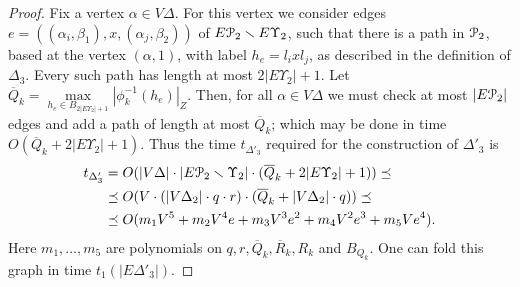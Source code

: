 \documentclass[a4paper,12pt]{article}
\renewcommand{\a}{\alpha }
\renewcommand{\b}{\beta }
\newcommand{\G}{\Gamma }
\newcommand{\D}{\Delta }
\newcommand{\T}{\Theta }
\newcommand{\U}{\Upsilon }
\newcommand{\cP}{{\cal{P}}}
\numberwithin{equation}{section}
\numberwithin{figure}{section}
\begin{document}
\begin{proof}
Fix a vertex $\a \in V\D$. For this vertex we consider edges
$e=((\a_i,\b_1), x,(\a_j,\b_2) )$ of $E\cP_2\smallsetminus E\U_2$,
such that there
is a path in $\cP_2$, based at the  vertex $(\a,1)$, with label
$h_e=l_i x l_j$, as described in the definition of $\D_3$. Every
such path has   length at most  $2 |E \U_2| +1$. Let
$\overline{Q}_k=\max\limits_{h_e \in B_{2|E \U_2|
+1}}|\phi^{-1}_k(h_e)|_Z$.
Then, for all $\a \in V\D$ we must check at most
$|E\cP_2|$ edges and add a path of length at most $\overline{Q}_k$;
 which may be done  in time $O(\overline{Q}_k+2 |E\U_2| +1)$.
Thus the time $t_{\D'_3}$ required for the construction of $\D'_3$
is
\begin{equation}\label{theta'3}
\begin{split}
t_{\D'_3} &= O(|V\D|\cdot |E\cP_2\smallsetminus \U_2|\cdot (\overline{Q}_k+2 |E \U_2| +1))\preceq\\
&\preceq     O(V \cdot (|V\D_2|\cdot q \cdot r) \cdot
(\overline{Q}_k+|V\D_2|\cdot q))\preceq\\
&\preceq  O(m_1 V^5 + m_2V^4 e +m_3 V^3 e^2 +m_4 V^2 e^3 + m_5 V
e^4).
\end{split}
\end{equation}
Here $m_1, \ldots, m_5$ are polynomials on $q, r, \overline{Q}_k,
\overline{R}_k, R_k$ and $B_{Q_k}$. One can fold this graph in
time $t_1(|E\D'_3|)$.


\end{proof}
\end{document}
